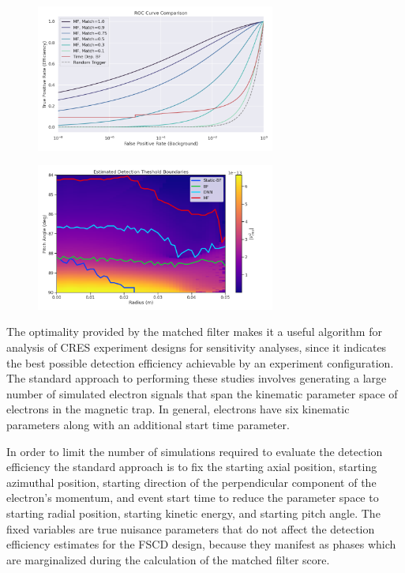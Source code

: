 \begin{figure}[htbp]
    \centering
    \includegraphics*[width=0.7\textwidth]{figs/Chapter-4/220223_mf_roc_curve_comparison_with_bf.png}
    \caption{}
\end{figure}

\begin{figure}[htbp]
    \centering
    \includegraphics*[width=0.7\textwidth]{figs/Chapter-4/220318_static_vs_bf_vs_mf_vs_dnn_detection_threshold_electron_paramter_map.png}
    \caption{}
\end{figure}

The optimality provided by the matched filter makes it a useful algorithm for analysis of CRES experiment designs for sensitivity analyses, since it indicates the best possible detection efficiency achievable by an experiment configuration. The standard approach to performing these studies involves generating a large number of simulated electron signals that span the kinematic parameter space of electrons in the magnetic trap. In general, electrons have six kinematic parameters along with an additional start time parameter. 

In order to limit the number of simulations required to evaluate the detection efficiency the standard approach is to fix the starting axial position, starting azimuthal position, starting direction of the perpendicular component of the electron's momentum, and event start time to reduce the parameter space to starting radial position, starting kinetic energy, and starting pitch angle. The fixed variables are true nuisance parameters that do not affect the detection efficiency estimates for the FSCD design, because they manifest as phases which are marginalized during the calculation of the matched filter score.

